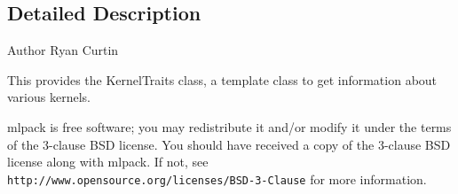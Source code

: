 \subsection{Detailed Description}
\begin{DoxyAuthor}{Author}
Ryan Curtin
\end{DoxyAuthor}
This provides the Kernel\+Traits class, a template class to get information about various kernels.

mlpack is free software; you may redistribute it and/or modify it under the terms of the 3-\/clause B\+SD license. You should have received a copy of the 3-\/clause B\+SD license along with mlpack. If not, see {\tt http\+://www.\+opensource.\+org/licenses/\+B\+S\+D-\/3-\/\+Clause} for more information. 